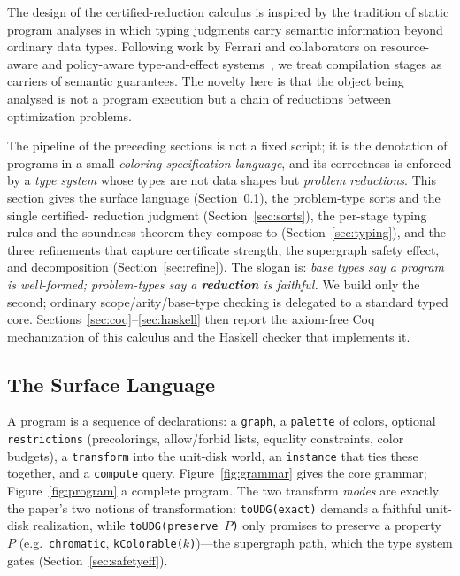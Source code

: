 \documentclass[11pt]{article}
\theoremstyle{definition}
\theoremstyle{remark}
\begin{document}
The design of the certified-reduction calculus is inspired by the tradition of
static program analyses in which typing judgments carry semantic information beyond
ordinary data types. Following work by Ferrari and collaborators on resource-aware
and policy-aware type-and-effect
systems~\cite{BodeiDeganoFerrari1998,BartolettiDeganoFerrariZunino2009,DeganoFerrariGalletta2016},
we treat compilation stages as carriers of semantic guarantees. The novelty here is
that the object being analysed is not a program execution but a chain of reductions
between optimization problems.

The pipeline of the preceding sections is not a fixed script; it is the
denotation of programs in a small \emph{coloring-specification language}, and its
correctness is enforced by a \emph{type system} whose types are not data shapes but
\emph{problem reductions}. This section gives the surface language
(Section~\ref{sec:surface}), the problem-type sorts and the single certified-
reduction judgment (Section~\ref{sec:sorts}), the per-stage typing rules and the
soundness theorem they compose to (Section~\ref{sec:typing}), and the three
refinements that capture certificate strength, the supergraph safety effect, and
decomposition (Section~\ref{sec:refine}). The slogan is: \emph{base types say a
program is well-formed; problem-types say a \textbf{reduction} is faithful.} We
build only the second; ordinary scope/arity/base-type checking is delegated to a
standard typed core. Sections~\ref{sec:coq}--\ref{sec:haskell} then report the
axiom-free Coq mechanization of this calculus and the Haskell checker that
implements it.

\subsection{The Surface Language}
\label{sec:surface}

A program is a sequence of declarations: a \texttt{graph}, a \texttt{palette} of
colors, optional \texttt{restrictions} (precolorings, allow/forbid lists, equality
constraints, color budgets), a \texttt{transform} into the unit-disk world, an
\texttt{instance} that ties these together, and a \texttt{compute} query.
Figure~\ref{fig:grammar} gives the core grammar; Figure~\ref{fig:program} a complete
program. The two transform \emph{modes} are exactly the paper's two notions of
transformation: \texttt{toUDG(exact)} demands a faithful unit-disk realization,
while \texttt{toUDG(preserve}~$P$\texttt{)} only promises to preserve a property
$P$ (e.g.\ \texttt{chromatic}, \texttt{kColorable($k$)})---the supergraph path,
which the type system gates (Section~\ref{sec:safetyeff}).
\end{document}
